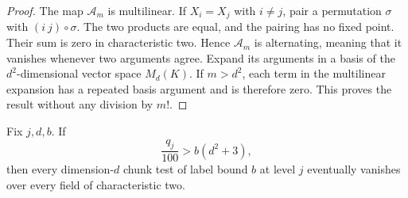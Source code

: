 \begin{proof}
The map $\mathcal A_m$ is multilinear.  If $X_i=X_j$ with $i\ne j$,
pair a permutation $\sigma$ with $(i\ j)\circ\sigma$.  The two products
are equal, and the pairing has no fixed point.  Their sum is zero in
characteristic two.  Hence $\mathcal A_m$ is alternating, meaning that
it vanishes whenever two arguments agree.  Expand its arguments in a
basis of the $d^2$-dimensional vector space $M_d(K)$.  If $m>d^2$, each
term in the multilinear expansion has a repeated basis argument and is
therefore zero.  This proves the result without any division by $m!$.
\end{proof}

\begin{lemma}
\label{ca:direct}
Fix $j,d,b$.  If
\begin{equation}
  \frac{q_j}{100}>b(d^2+3),
  \label{ca:direct-bound}
\end{equation}
then every dimension-$d$ chunk test of label bound $b$ at level $j$
eventually vanishes over every field of characteristic two.
\end{lemma}

